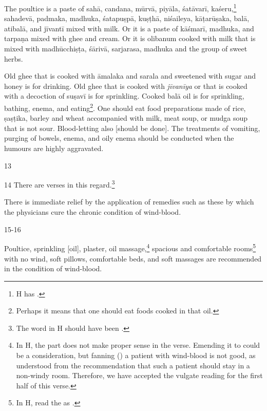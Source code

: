 \begin{translation}
    The poultice is a paste of \gls{sahā}, \gls{candana}, \gls{mūrvā}, \gls{piyāla}, \gls{śatāvarī}, \gls{kaśeru},\footnote{H has .} \gls{sahadevā}, \gls{padmaka}, \gls{madhuka}, \gls{śatapuṣpā}, \gls{kuṣṭhā}, \gls{niśaileya}, \gls{kāṭarūṣaka}, \gls{balā}, \gls{atibalā}, and \gls{jīvantī} mixed with milk. Or it is a paste of \gls{kāśmarī}, \gls{madhuka}, and \gls{tarpaṇa} mixed with ghee and cream. Or it is olibanum cooked with milk that is mixed with \gls{madhūcchiṣṭa}, \gls{śārivā}, \gls{sarjarasa}, \gls{madhuka} and the group of sweet herbs. 

    Old ghee that is cooked with \gls{āmalaka} and \gls{sarala} and sweetened with sugar and honey is for drinking. Old ghee that is cooked with \textit{jīvanīya} or that is cooked with a decoction of \gls{suṣavī} is for sprinkling. Cooked \gls{balā} oil is for sprinkling, bathing, enema, and eating\footnote{Perhaps it means that one should eat foods cooked in that oil.}. One should eat food preparations made of rice, \gls{ṣaṣṭika}, barley and wheat accompanied with milk, meat soup, or \gls{mudga} soup that is not sour. Blood-letting also [should be done]. The treatments of vomiting, purging of bowels, enema, and oily enema should be conducted when the humours are highly aggravated.

    \item[13] 

    \item[14] There are verses in this regard.\footnote{The word  in H should have been .}
    \begin{sloka}
    There is immediate relief by the application of remedies such as these by which the physicians cure the chronic condition of wind-blood. 
    \end{sloka}

    \item[15-16]
    \begin{sloka}
    Poultice, sprinkling [oil], plaster, oil massage,\footnote{In H, the part  does not make proper sense in the verse. Emending it to  could be a consideration, but fanning () a patient with wind-blood is not good, as understood from the recommendation that such a patient should stay in a non-windy room. Therefore, we have accepted the vulgate reading for the first half of this verse.} spacious and comfortable rooms\footnote{In H, read the   as .} with no wind, soft pillows, comfortable beds, and soft massages are recommended in the condition of wind-blood.
    \end{sloka}


\end{translation}
